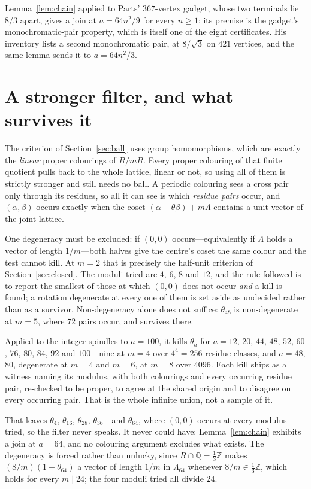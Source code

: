 \documentclass[11pt,reqno]{amsart}
\theoremstyle{plain}
\theoremstyle{definition}
\newcommand{\Z}{\mathbb{Z}}
\newcommand{\Q}{\mathbb{Q}}
\newcommand{\Lat}{R}
\newcommand{\Lam}{\Lambda}
\begin{document}
Lemma~\ref{lem:chain} applied to Parts' $367$-vertex gadget, whose two terminals
lie $8/3$ apart, gives a join at $a = 64n^2/9$ for every $n \ge 1$; its premise
is the gadget's monochromatic-pair property, which is itself one of the eight
certificates. His inventory lists a second monochromatic pair, at $8/\sqrt3$ on
$421$ vertices, and the same lemma sends it to $a = 64n^2/3$.

\section{A stronger filter, and what survives it}\label{sec:stronger}

The criterion of Section~\ref{sec:ball} uses group homomorphisms, which are
exactly the \emph{linear} proper colourings of $\Lat/m\Lat$. Every proper
colouring of that finite quotient pulls back to the whole lattice, linear or not,
so using all of them is strictly stronger and still needs no ball. A periodic
colouring sees a cross pair only through its residues, so all it can see is which
\emph{residue pairs} occur, and $(\alpha,\beta)$ occurs exactly when the coset
$(\alpha - \theta\beta) + m\Lam$ contains a unit vector of the joint lattice.

One degeneracy must be excluded: if $(0,0)$ occurs---equivalently if $\Lam$ holds
a vector of length $1/m$---both halves give the centre's coset the same colour
and the test cannot kill. At $m = 2$ that is precisely the half-unit criterion of
Section~\ref{sec:closed}. The moduli tried are $4$, $6$, $8$ and $12$, and the
rule followed is to report the smallest of those at which $(0,0)$ does not occur
\emph{and} a kill is found; a rotation degenerate at every one of them is set
aside as undecided rather than as a survivor. Non-degeneracy alone does not
suffice: $\theta_{48}$ is non-degenerate at $m = 5$, where $72$ pairs occur, and
survives there.

Applied to the integer spindles to $a = 100$, it kills $\theta_a$ for $a = 12$,
$20$, $44$, $48$, $52$, $60$, $76$, $80$, $84$, $92$ and $100$---nine at $m = 4$
over $4^4 = 256$ residue classes, and $a = 48$, $80$, degenerate at $m = 4$ and
$m = 6$, at $m = 8$ over $4096$. Each kill ships as a witness naming its modulus,
with both colourings and every occurring residue pair, re-checked to be proper,
to agree at the shared origin and to disagree on every occurring pair. That is
the whole infinite union, not a sample of it.

That leaves $\theta_4$, $\theta_{16}$, $\theta_{28}$, $\theta_{36}$---and
$\theta_{64}$, where $(0,0)$ occurs at every modulus tried, so the filter never
speaks. It never could have: Lemma~\ref{lem:chain} exhibits a join at $a = 64$,
and no colouring argument excludes what exists. The degeneracy is forced rather
than unlucky, since $\Lat \cap \Q = \tfrac13\Z$ makes $(8/m)(1-\theta_{64})$ a
vector of length $1/m$ in $\Lam_{64}$ whenever $8/m \in \tfrac13\Z$, which holds
for every $m \mid 24$; the four moduli tried all divide $24$.
\end{document}
